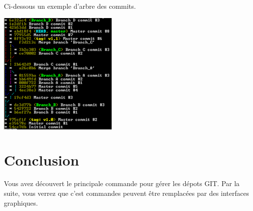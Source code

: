 \documentclass[french, 12pt]{article}%
\begin{document}
\begin{itemize}
Ci-dessous un exemple d'arbre des commits.
\begin{center}
\includegraphics[scale=0.8]{./ressource/git_tree.png}
\end{center}

\end{itemize}



\section{Conclusion}

Vous avez découvert le principale commande pour gérer les dépots GIT. Par la suite, vous verrez que c'est commandes peuvent être remplacées par des interfaces graphiques. 
\end{document}
